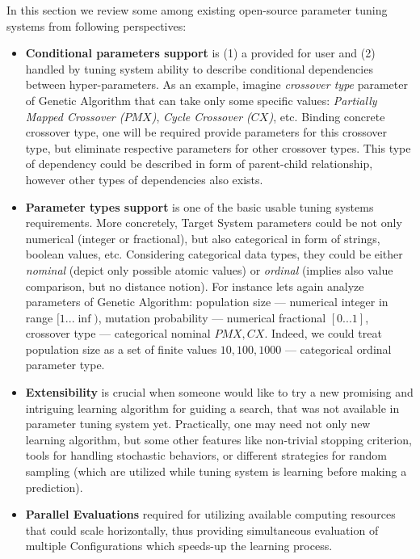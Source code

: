 In this section we review some among existing open-source parameter tuning systems from following perspectives:
\begin{itemize}
	\item \textbf{Conditional parameters support} is (1) a provided for user and (2) handled by tuning system ability to describe conditional dependencies between hyper-parameters. As an example, imagine \textit{crossover type} parameter of Genetic Algorithm that can take only some specific values: \textit{Partially Mapped Crossover ($PMX$)}, \textit{Cycle Crossover ($CX$)}, etc. Binding concrete crossover type, one will be required provide parameters for this crossover type, but eliminate respective parameters for other crossover types. This type of dependency could be described in form of parent-child relationship, however other types of dependencies also exists.
	
	\item \textbf{Parameter types support} is one of the basic usable tuning systems requirements. More concretely, Target System parameters could be not only numerical (integer or fractional), but also categorical in form of strings, boolean values, etc. Considering categorical data types, they could be either \textit{nominal} (depict only possible atomic values) or \textit{ordinal} (implies also value comparison, but no distance notion). For instance lets again analyze parameters of Genetic Algorithm: population size — numerical integer in range $[1...\inf)$, mutation probability — numerical fractional $[0...1]$, crossover type — categorical nominal ${PMX, CX}$. Indeed, we could treat population size as a set of finite values ${10, 100, 1000}$ — categorical ordinal parameter type.
	
	\item \textbf{Extensibility} is crucial when someone would like to try a new promising and intriguing learning algorithm for guiding a search, that was not available in parameter tuning system yet. Practically, one may need not only new learning algorithm, but some other features like non-trivial stopping criterion, tools for handling stochastic behaviors, or different strategies for random sampling (which are utilized while tuning system is learning before making a prediction).
	
	\item \textbf{Parallel Evaluations} required for utilizing available computing resources that could scale horizontally, thus providing simultaneous evaluation of multiple Configurations which speeds-up the learning process.
\end{itemize}

